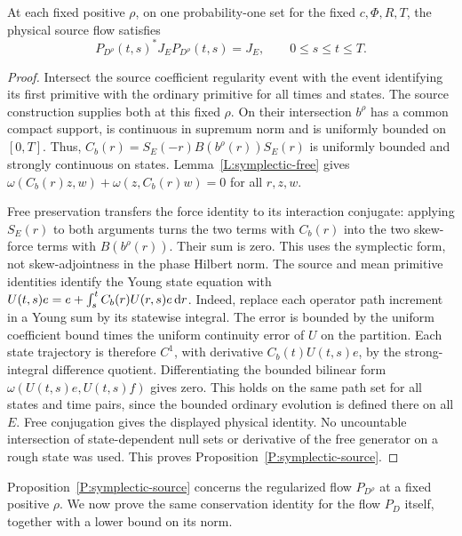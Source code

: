 \begin{proposition}\label{P:symplectic-source}
  At each fixed positive $\rho$, on one probability-one set for the fixed
  $c,\Phi,R,T$, the physical source flow satisfies
  \[
    P_{D^\rho}(t,s)^*J_EP_{D^\rho}(t,s)=J_E,
    \qquad 0\le s\le t\le T .
  \]
\end{proposition}

\begin{proof}
  Intersect the source coefficient regularity event with the event identifying
  its first primitive with the ordinary primitive for all times and states. The
  source construction supplies both at this fixed $\rho$. On their intersection
  $b^\rho$ has a common compact support, is continuous in supremum norm and is
  uniformly bounded on $[0,T]$. Thus, $C_b(r) = S_E(-r)B(b^\rho(r))S_E(r)$ is
  uniformly bounded and strongly continuous on states.
  Lemma~\ref{L:symplectic-free} gives $\omega(C_b(r)z,w)+\omega(z,C_b(r)w) = 0$
  for all $r,z,w$.

  Free preservation transfers the force identity to its interaction conjugate:
  applying $S_E(r)$ to both arguments turns the two terms with $C_b(r)$ into
  the two skew-force terms with $B(b^\rho(r))$. Their sum is zero. This uses
  the symplectic form, not skew-adjointness in the phase Hilbert norm.
  The source and mean primitive identities identify the Young state equation
  with $U(t,s)e = e+\int_s^t C_b(r)U(r,s)e\,\mathrm{d} r$. Indeed, replace each operator
  path increment in a Young sum by its statewise integral. The error is bounded
  by the uniform coefficient bound times the uniform continuity error of $U$ on
  the partition. Each state trajectory is therefore $C^1$, with derivative
  $C_b(t)U(t,s)e$, by the strong-integral difference quotient. Differentiating
  the bounded bilinear form $\omega(U(t,s)e,U(t,s)f)$ gives zero. This holds on
  the same path set for all states and time pairs, since the bounded ordinary
  evolution is defined there on all $E$. Free conjugation gives the displayed
  physical identity. No uncountable intersection of state-dependent null sets or
  derivative of the free generator on a rough state was used. This proves
  Proposition~\ref{P:symplectic-source}.
\end{proof}

Proposition~\ref{P:symplectic-source} concerns the regularized flow
$P_{D^\rho}$ at a fixed positive $\rho$. We now prove the same conservation
identity for the flow $P_D$ itself, together with a lower bound on its norm.

